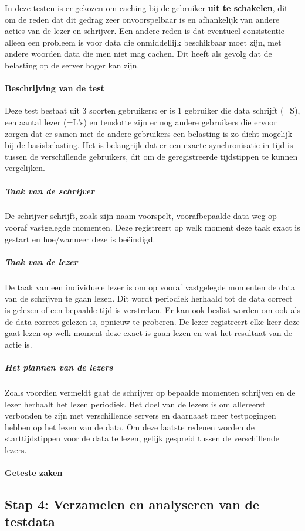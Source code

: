 In deze testen is er gekozen om caching bij de gebruiker \textbf{uit te schakelen}, dit om de reden dat dit gedrag zeer onvoorspelbaar is en afhankelijk van andere acties van de lezer en schrijver. Een andere reden is dat eventueel consistentie alleen een probleem is voor data die onmiddellijk beschikbaar moet zijn, met andere woorden data die men niet mag cachen. Dit heeft als gevolg dat de belasting op de server hoger kan zijn. 

\paragraph{Beschrijving van de test} Deze test bestaat uit 3 soorten gebruikers: er is 1 gebruiker die data schrijft (=S), een aantal lezer (=L's) en tenslotte zijn er nog andere gebruikers die ervoor zorgen dat er samen met de andere gebruikers een belasting is zo dicht mogelijk bij de basisbelasting. 
Het is belangrijk dat er een exacte synchronisatie in tijd is tussen de verschillende gebruikers, dit om de geregistreerde tijdstippen te kunnen vergelijken.

\subparagraph{Taak van de schrijver} De schrijver schrijft, zoals zijn naam voorspelt, voorafbepaalde data weg op vooraf vastgelegde momenten. Deze registreert op welk moment deze taak exact is gestart en hoe/wanneer deze is beëindigd.

\subparagraph{Taak van de lezer} De taak van een individuele lezer is om op vooraf vastgelegde momenten de data van de schrijven te gaan lezen. Dit wordt periodiek herhaald tot de data correct is gelezen of een bepaalde tijd is verstreken. Er kan ook beslist worden om ook als de data correct gelezen is, opnieuw te proberen. De lezer registreert elke keer deze gaat lezen op welk moment deze exact is gaan lezen en wat het resultaat van de actie is.  

\subparagraph{Het plannen van de lezers} Zoals voordien vermeldt gaat de schrijver op bepaalde momenten schrijven en de lezer herhaalt het lezen periodiek. Het doel van de lezers is om allereerst verbonden te zijn met verschillende servers en daarnaast meer testpogingen hebben op het lezen van de data. Om deze laatste redenen worden de starttijdstippen voor de data te lezen, gelijk gespreid tussen de verschillende lezers. 

\paragraph{Geteste zaken} 
\subsection*{Stap 4: Verzamelen en analyseren van de testdata}

